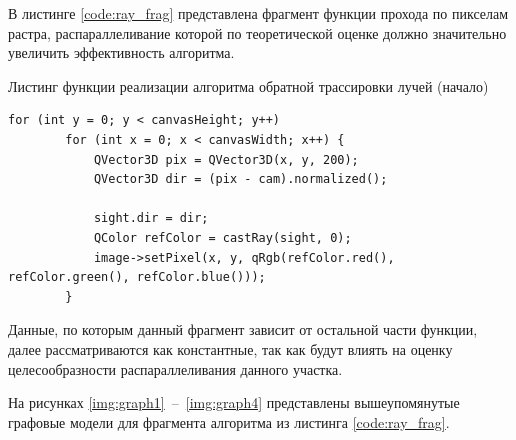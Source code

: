 В листинге \ref{code:ray_frag} представлена фрагмент функции прохода по пикселам растра, распараллеливание которой по теоретической оценке должно значительно увеличить эффективность алгоритма.

\begin{code}
\caption{Листинг функции реализации алгоритма обратной трассировки лучей (начало)}
\label{code:ray_frag}
\begin{verbatim}
for (int y = 0; y < canvasHeight; y++)
        for (int x = 0; x < canvasWidth; x++) {
            QVector3D pix = QVector3D(x, y, 200);
            QVector3D dir = (pix - cam).normalized();

            sight.dir = dir;
            QColor refColor = castRay(sight, 0);
            image->setPixel(x, y, qRgb(refColor.red(), refColor.green(), refColor.blue()));
        }
\end{verbatim}
\end{code}

Данные, по которым данный фрагмент зависит от остальной части функции, далее рассматриваются как константные, так как будут влиять на оценку целесообразности распараллеливания данного участка.

На рисунках \ref{img:graph1}~--~\ref{img:graph4} представлены вышеупомянутые графовые модели для фрагмента алгоритма из листинга \ref{code:ray_frag}.

